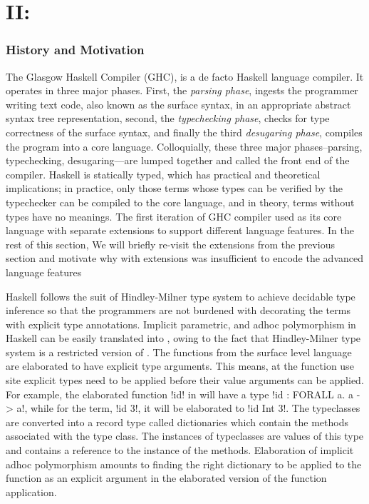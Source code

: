 \documentclass[screen,nonacm,manuscript,review]{acmart} %
\begin{document}
\part{II: \SFC}\label{part:II}
\section{History and Motivation}
The Glasgow Haskell Compiler (GHC)\cite{ghc_2020}, is a de facto
Haskell language\cite{haskell_2010} compiler. It operates in
three major phases. First, the \emph{parsing phase}, ingests the
programmer writing text code, also known as
the surface syntax, in an appropriate abstract syntax tree
representation, second, the \emph{typechecking phase},
checks for type correctness of the surface syntax, and finally the
third \emph{desugaring phase}, compiles the program into a core
language. Colloquially, these three major phases--parsing,
typechecking, desugaring---are lumped together and called
the front end of the compiler. Haskell is statically typed,
which has practical and theoretical implications;
in practice, only those terms whose types can be verified by the
typechecker can be compiled to the core language, and in theory,
terms without types have no meanings. The first iteration of GHC
compiler used \SF as its core language with separate extensions to
support different language features. In the rest of this section, We will
briefly re-visit the extensions  from the previous section and
motivate why \SF with extensions was insufficient to encode the
advanced language features

Haskell follows the suit of Hindley-Milner type
system\cite{milner_theory_1978} to achieve decidable type inference so
that the programmers are not burdened with decorating the terms with
explicit type annotations.
Implicit parametric\cite{reynolds_user-defined_1978}, and adhoc
polymorphism\cite{hall_type_1994} in Haskell can be easily
translated into \SF, owing to the fact that Hindley-Milner type
system is a restricted version of \SF. The functions from the surface
level language are elaborated to have explicit type arguments. This
means, at the function use site explicit types need to be applied
before their value arguments can be applied.
For example, the elaborated function !id! in \SF will have a type
!id : FORALL a. a -> a!, while for the term, !id 3!, it will be elaborated
to !id Int 3!. The typeclasses are converted into a record type called
dictionaries\cite{wadler_polymorphism_1989} which contain the methods
associated with the type class. The instances of typeclasses are
values of this type and contains a reference to the instance of the
methods. Elaboration of implicit adhoc polymorphism amounts to finding
the right dictionary to be applied to the function as an explicit
argument in the elaborated version of the function application.
\end{document}
